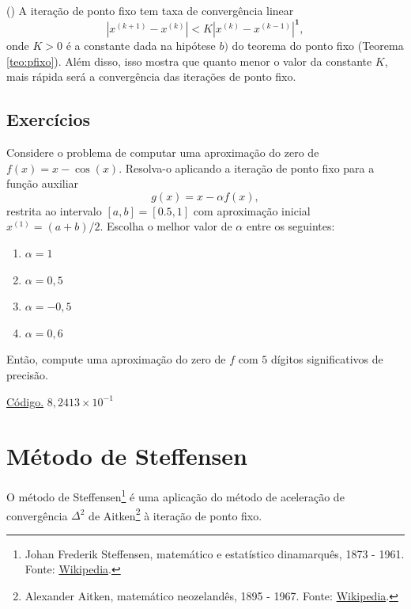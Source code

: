 \begin{obs}()
  A iteração de ponto fixo tem taxa de convergência linear
  \begin{equation}
    |x^{(k+1)} - x^{(k)}| < K|x^{(k)} - x^{(k-1)}|^{\pmb{1}},
  \end{equation}
onde $K > 0$ é a constante dada na hipótese $b)$ do teorema do ponto fixo (Teorema \ref{teo:pfixo}). Além disso, isso mostra que quanto menor o valor da constante $K$, mais rápida será a convergência das iterações de ponto fixo.
\end{obs}

\subsection*{Exercícios}

\begin{exer}\label{exer:pfixo_1}
  Considere o problema de computar uma aproximação do zero de $f(x)=x-\cos(x)$. Resolva-o aplicando a iteração de ponto fixo para a função auxiliar
  \begin{equation}
    g(x) = x - \alpha f(x),
  \end{equation}
restrita ao intervalo $[a, b] = [0.5, 1]$ com aproximação inicial $x^{(1)}=(a+b)/2$. Escolha o melhor valor de $\alpha$ entre os seguintes:
\begin{enumerate}
\item $\alpha = 1$
\item $\alpha = 0,5$
\item $\alpha = -0,5$
\item $\alpha = 0,6$
\end{enumerate}
Então, compute uma aproximação do zero de $f$ com $5$ dígitos significativos de precisão.
\end{exer}
\begin{resp}
  \ifisoctave 
  \href{https://github.com/phkonzen/notas/blob/master/src/MatematicaNumerica/cap_eq1d/dados/exer_pfixo_1/exer_pfixo_1.m}{Código.} 
  \fi
  $8,2413\times 10^{-1}$
\end{resp}

\section{Método de Steffensen}\label{cap_eq1d_sec_Steffensen}

O método de Steffensen\footnote{Johan Frederik Steffensen, matemático e estatístico dinamarquês, 1873 - 1961. Fonte: \href{https://en.wikipedia.org/wiki/Johan_Frederik_Steffensen}{Wikipedia}.} é uma aplicação do método de aceleração de convergência $\Delta^2$ de Aitken\footnote{Alexander Aitken, matemático neozelandês, 1895 - 1967. Fonte: \href{https://en.wikipedia.org/wiki/Alexander_Aitken}{Wikipedia}.} à iteração de ponto fixo.

